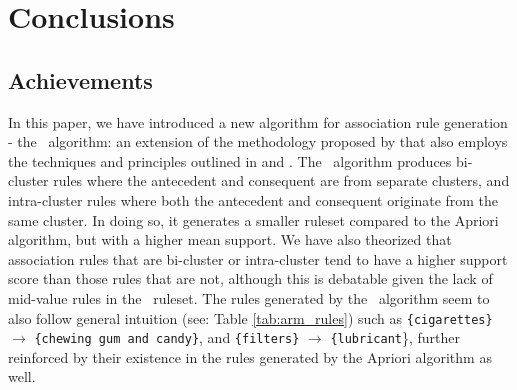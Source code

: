 \chapter{Conclusions}
\section{Achievements}
In this paper, we have introduced a new algorithm for association rule generation - the \algo\ algorithm: an extension of the methodology proposed by  that also employs the techniques and principles outlined in  and . The \algo\ algorithm produces bi-cluster rules where the antecedent and consequent are from separate clusters, and intra-cluster rules where both the antecedent and consequent originate from the same cluster.
In doing so, it generates a smaller ruleset compared to the Apriori algorithm, but with a higher mean support.
We have also theorized that association rules that are bi-cluster or intra-cluster tend to have a higher support score than those rules that are not, although this is debatable given the lack of mid-value rules in the \algo\ ruleset.
 The rules generated by the \algo\ algorithm seem to also follow general intuition (see: Table \ref{tab:arm_rules}) such as \texttt{\{cigarettes\}} $\rightarrow$ \texttt{\{chewing gum and candy\}}, and \texttt{\{filters\}} $\rightarrow$ \texttt{\{lubricant}\}, further reinforced by their existence in the rules generated by the Apriori algorithm as well.

